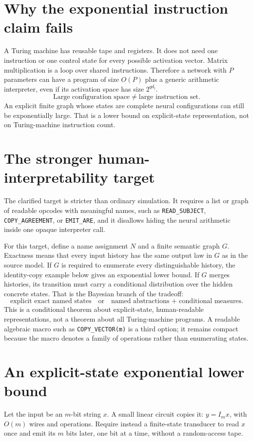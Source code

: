 \documentclass[11pt]{article}
\begin{document}
\section{Why the exponential instruction claim fails}
A Turing machine has reusable tape and registers. It does not need one instruction or one control state for every possible activation vector. Matrix multiplication is a loop over shared instructions. Therefore a network with $P$ parameters can have a program of size $O(P)$ plus a generic arithmetic interpreter, even if its activation space has size $2^{qd_l}$.
\[
\text{Large configuration space}\ne\text{large instruction set}.
\]
An explicit finite graph whose states are complete neural configurations can still be exponentially large. That is a lower bound on explicit-state representation, not on Turing-machine instruction count.
\section{The stronger human-interpretability target}
The clarified target is stricter than ordinary simulation. It requires a list or graph of readable opcodes with meaningful names, such as \texttt{READ\_SUBJECT}, \texttt{COPY\_AGREEMENT}, or \texttt{EMIT\_ARE}, and it disallows hiding the neural arithmetic inside one opaque interpreter call.

For this target, define a name assignment $N$ and a finite semantic graph $G$. Exactness means that every input history has the same output law in $G$ as in the source model. If $G$ is required to enumerate every distinguishable history, the identity-copy example below gives an exponential lower bound. If $G$ merges histories, its transition must carry a conditional distribution over the hidden concrete states. That is the Bayesian branch of the tradeoff:
\[
\text{explicit exact named states}\quad\text{or}\quad\text{named abstractions + conditional measures}.
\]
This is a conditional theorem about explicit-state, human-readable representations, not a theorem about all Turing-machine programs. A readable algebraic macro such as \texttt{COPY\_VECTOR(m)} is a third option; it remains compact because the macro denotes a family of operations rather than enumerating states.
\section{An explicit-state exponential lower bound}
Let the input be an $m$-bit string $x$. A small linear circuit copies it: $y=I_mx$, with $O(m)$ wires and operations. Require instead a finite-state transducer to read $x$ once and emit its $m$ bits later, one bit at a time, without a random-access tape.
\end{document}
